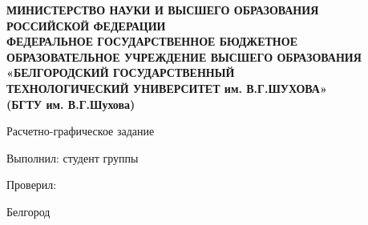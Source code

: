 \begin{titlepage}
\thispagestyle{empty}
\setlength{\parindent}{0ex} 

\begin{center}
  \textbf{МИНИСТЕРСТВО НАУКИ И ВЫСШЕГО ОБРАЗОВАНИЯ\\
РОССИЙСКОЙ ФЕДЕРАЦИИ\\
ФЕДЕРАЛЬНОЕ ГОСУДАРСТВЕННОЕ БЮДЖЕТНОЕ ОБРАЗОВАТЕЛЬНОЕ УЧРЕЖДЕНИЕ
ВЫСШЕГО ОБРАЗОВАНИЯ
«БЕЛГОРОДСКИЙ ГОСУДАРСТВЕННЫЙ\\
ТЕХНОЛОГИЧЕСКИЙ УНИВЕРСИТЕТ им. В.Г.ШУХОВА»\\
(БГТУ им. В.Г.Шухова)
}
\end{center}

\vspace{50mm}

\begin{center}
  Расчетно-графическое задание
  \SubjectLineTitle
  \ThemeLineTitle
\end{center}

\vspace{40mm}

\begin{minipage}{.60\linewidth}
    Выполнил: студент группы \Group

    \smallskip

    Проверил:
\end{minipage}
\hfill
\begin{minipage}{.4\linewidth}
  \begin{flushright}
    \AuthorFIO

    \smallskip

    \LecturerFIO
  \end{flushright}
\end{minipage}

\vfill
\begin{center}
  Белгород \Year
\end{center}

\setlength{\parindent}{1.25cm} 
\end{titlepage}
